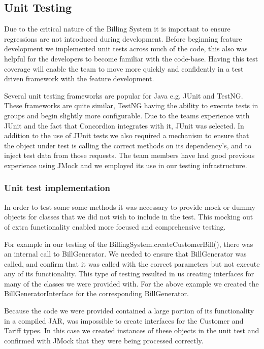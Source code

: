 \documentclass[pdftex,11pt,a4paper]{article}
\begin{document}
\subsection{Unit Testing}

Due to the critical nature of the Billing System it is important to ensure regressions are not introduced during development. Before beginning feature development we implemented unit tests across much of the code, this also was helpful for the developers to become familiar with the code-base. Having this test coverage will enable the team to move more quickly and confidently in a test driven framework with the feature development.

Several unit testing frameworks are popular for Java e.g. JUnit and TestNG. These frameworks are quite similar, TestNG having the ability to execute tests in groups and begin slightly more configurable. Due to the teams experience with JUnit and the fact that Concordion integrates with it, JUnit was selected. In addition to the use of JUnit tests we also required a mechanism to ensure that the object under test is calling the correct methods on its dependency's, and to inject test data from those requests. The team members have had good previous experience using JMock and we employed its use in our testing infrastructure.

\subsubsection{Unit test implementation}
In order to test some some methods it was necessary to provide mock or dummy objects for classes that we did not wish to include in the test. This mocking out of extra functionality enabled more focused and comprehensive testing.

For example in our testing of the BillingSystem.createCustomerBill(), there was an internal call to BillGenerator. We needed to ensure that BillGenerator was called, and confirm that it was called with the correct parameters but not execute any of its functionality. This type of testing resulted in us creating interfaces for many of the classes we were provided with. For the above example we created the BillGeneratorInterface for the corresponding BillGenerator.

Because the code we were provided contained a large portion of its functionality in a compiled JAR, was impossible to create interfaces for the Customer and Tariff types. In this case we created instances of these objects in the unit test and confirmed with JMock that they were being processed correctly.
\end{document}
